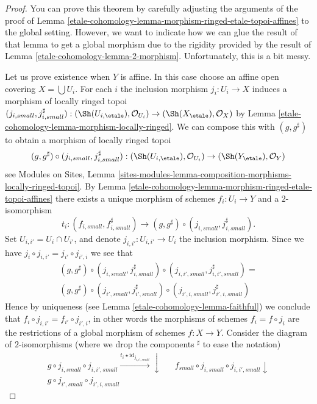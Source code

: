 \begin{proof}
You can prove this theorem by carefully adjusting the arguments of
the proof of
Lemma \ref{etale-cohomology-lemma-morphism-ringed-etale-topoi-affines}
to the global setting. However, we want to indicate how we
can glue the result of that lemma to get a global morphism
due to the rigidity provided by the result of
Lemma \ref{etale-cohomology-lemma-2-morphism}.
Unfortunately, this is a bit messy.

\medskip\noindent
Let us prove existence when $Y$ is affine. In this case choose an
affine open covering $X = \bigcup U_i$. For each $i$ the inclusion
morphism $j_i : U_i \to X$ induces a morphism of locally ringed topoi
$(j_{i, small}, j_{i, small}^\sharp) :
(\Sh(U_{i, \etale}), \mathcal{O}_{U_i})
\to
(\Sh(X_\etale), \mathcal{O}_X)$
by
Lemma \ref{etale-cohomology-lemma-morphism-locally-ringed}.
We can compose this with $(g, g^\sharp)$ to obtain a morphism
of locally ringed topoi
$$
(g, g^\sharp) \circ (j_{i, small}, j_{i, small}^\sharp) :
(\Sh(U_{i, \etale}), \mathcal{O}_{U_i})
\to
(\Sh(Y_\etale), \mathcal{O}_Y)
$$
see
Modules on Sites,
Lemma \ref{sites-modules-lemma-composition-morphisms-locally-ringed-topoi}.
By
Lemma \ref{etale-cohomology-lemma-morphism-ringed-etale-topoi-affines}
there exists a unique morphism of schemes $f_i : U_i \to Y$
and a $2$-isomorphism
$$
t_i :
(f_{i, small}, f_{i, small}^\sharp)
\longrightarrow
(g, g^\sharp) \circ (j_{i, small}, j_{i, small}^\sharp).
$$
Set $U_{i, i'} = U_i \cap U_{i'}$, and denote $j_{i, i'} : U_{i, i'} \to U_i$
the inclusion morphism. Since we have
$j_i \circ j_{i, i'} = j_{i'} \circ j_{i', i}$
we see that
\begin{align*}
(g, g^\sharp) \circ
(j_{i, small}, j_{i, small}^\sharp) \circ
(j_{i, i', small}, j_{i, i', small}^\sharp)
= \\
(g, g^\sharp) \circ
(j_{i', small}, j_{i', small}^\sharp) \circ
(j_{i', i, small}, j_{i', i, small}^\sharp)
\end{align*}
Hence by uniqueness (see
Lemma \ref{etale-cohomology-lemma-faithful})
we conclude that
$f_i \circ j_{i, i'} = f_{i'} \circ j_{i', i}$, in other words the
morphisms of schemes $f_i = f \circ j_i$ are the restrictions of a
global morphism of schemes $f : X \to Y$. Consider the diagram
of $2$-isomorphisms (where we drop the components ${}^\sharp$ to ease the
notation)
$$
\begin{array}{ccc}g \circ j_{i, small} \circ j_{i, i', small}
\overset{t_i \star \text{id}_{j_{i, i', small}}}{\longrightarrow}\downarrow &  & f_{small} \circ j_{i, small} \circ j_{i, i', small} \downarrow \\ g \circ j_{i', small} \circ j_{i', i, small}

\end{array}$$
\end{proof}
